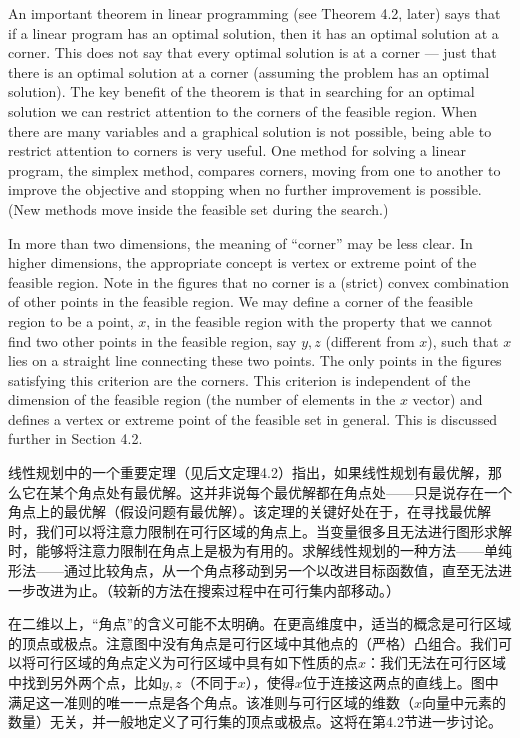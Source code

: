 \begin{original}
An important theorem in linear programming (see Theorem 4.2, later) says that if a linear program has an optimal solution, then it has an optimal solution at a corner. This does not say that every optimal solution is at a corner --- just that there is an optimal solution at a corner (assuming the problem has an optimal solution). The key benefit of the theorem is that in searching for an optimal solution we can restrict attention to the corners of the feasible region. When there are many variables and a graphical solution is not possible, being able to restrict attention to corners is very useful. One method for solving a linear program, the simplex method, compares corners, moving from one to another to improve the objective and stopping when no further improvement is possible. (New methods move inside the feasible set during the search.)

In more than two dimensions, the meaning of ``corner'' may be less clear. In higher dimensions, the appropriate concept is vertex or extreme point of the feasible region. Note in the figures that no corner is a (strict) convex combination of other points in the feasible region. We may define a corner of the feasible region to be a point, $x$, in the feasible region with the property that we cannot find two other points in the feasible region, say $y, z$ (different from $x$), such that $x$ lies on a straight line connecting these two points. The only points in the figures satisfying this criterion are the corners. This criterion is independent of the dimension of the feasible region (the number of elements in the $x$ vector) and defines a vertex or extreme point of the feasible set in general. This is discussed further in Section 4.2.
\end{original}
\begin{translation}
线性规划中的一个重要定理（见后文定理4.2）指出，如果线性规划有最优解，那么它在某个角点处有最优解。这并非说每个最优解都在角点处——只是说存在一个角点上的最优解（假设问题有最优解）。该定理的关键好处在于，在寻找最优解时，我们可以将注意力限制在可行区域的角点上。当变量很多且无法进行图形求解时，能够将注意力限制在角点上是极为有用的。求解线性规划的一种方法——单纯形法——通过比较角点，从一个角点移动到另一个以改进目标函数值，直至无法进一步改进为止。（较新的方法在搜索过程中在可行集内部移动。）

在二维以上，``角点''的含义可能不太明确。在更高维度中，适当的概念是可行区域的顶点或极点。注意图中没有角点是可行区域中其他点的（严格）凸组合。我们可以将可行区域的角点定义为可行区域中具有如下性质的点$x$：我们无法在可行区域中找到另外两个点，比如$y, z$（不同于$x$），使得$x$位于连接这两点的直线上。图中满足这一准则的唯一一点是各个角点。该准则与可行区域的维数（$x$向量中元素的数量）无关，并一般地定义了可行集的顶点或极点。这将在第4.2节进一步讨论。
\end{translation}

